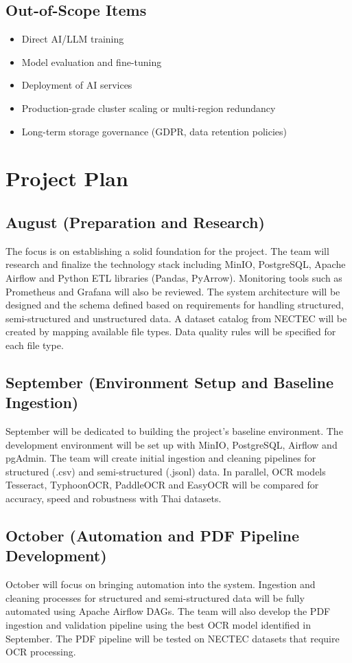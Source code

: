 \documentclass[12pt,oneside,openright,a4paper]{cpe-english-project}
\begin{document}
\subsection{Out-of-Scope Items}
\begin{itemize}
\item Direct AI/LLM training
\item Model evaluation and fine-tuning
\item Deployment of AI services
\item Production-grade cluster scaling or multi-region redundancy
\item Long-term storage governance (GDPR, data retention policies)
\end{itemize}

\section{Project Plan}

\subsection{August (Preparation and Research)}
The focus is on establishing a solid foundation for the project. The team will research and finalize the technology stack including MinIO, PostgreSQL, Apache Airflow and Python ETL libraries (Pandas, PyArrow). Monitoring tools such as Prometheus and Grafana will also be reviewed. The system architecture will be designed and the schema defined based on requirements for handling structured, semi-structured and unstructured data. A dataset catalog from NECTEC will be created by mapping available file types. Data quality rules will be specified for each file type.

\subsection{September (Environment Setup and Baseline Ingestion)}
September will be dedicated to building the project's baseline environment. The development environment will be set up with MinIO, PostgreSQL, Airflow and pgAdmin. The team will create initial ingestion and cleaning pipelines for structured (.csv) and semi-structured (.jsonl) data. In parallel, OCR models Tesseract, TyphoonOCR, PaddleOCR and EasyOCR will be compared for accuracy, speed and robustness with Thai datasets.

\subsection{October (Automation and PDF Pipeline Development)}
October will focus on bringing automation into the system. Ingestion and cleaning processes for structured and semi-structured data will be fully automated using Apache Airflow DAGs. The team will also develop the PDF ingestion and validation pipeline using the best OCR model identified in September. The PDF pipeline will be tested on NECTEC datasets that require OCR processing.
\end{document}
